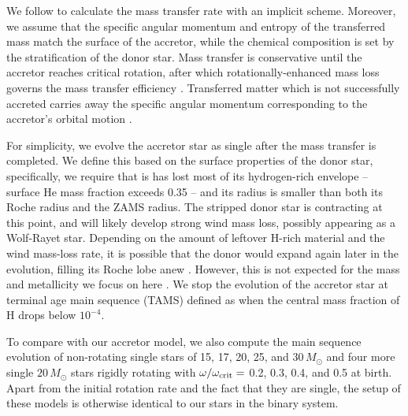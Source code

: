 \documentclass[twocolumn,twocolappendix,trackchanges]{aastex63}
\begin{document}
We follow \cite{kolb:90} to calculate the mass transfer rate with an
implicit scheme. Moreover, we assume that the specific angular
momentum and entropy of the transferred mass match the surface of the
accretor, while the chemical composition is set by the stratification
of the donor star. Mass transfer is conservative until the accretor
reaches critical rotation, after which rotationally-enhanced mass loss
governs the mass transfer efficiency \citep[e.g.,][]{petrovic:05}.
Transferred matter which is not successfully accreted carries away the
specific angular momentum corresponding to the accretor's orbital
motion \citep[e.g.,][]{soberman:97, vandenheuvel:17}.


For simplicity, we evolve the accretor star as single after the mass
transfer is completed. We define this based on the surface properties
of the donor star, specifically, we require that is has lost most of
its hydrogen-rich envelope -- surface He mass fraction exceeds 0.35 --
and its radius is smaller than both its Roche radius and the ZAMS
radius. The stripped donor star is contracting at this point, and
will likely develop strong wind mass loss, possibly appearing as a
Wolf-Rayet star. Depending on the amount of leftover H-rich material
and the wind mass-loss rate, it is possible that the donor would
expand again later in the evolution, filling its Roche lobe anew
\citep[cf.,][]{gilkis:19}. However, this is not expected for the mass
and metallicity we focus on here \citep[e.g.,][]{laplace:20}. We stop the evolution
of the accretor star at terminal age main sequence (TAMS) defined as
when the central mass fraction of H drops below $10^{-4}$.

To compare with our accretor model, we also compute the main sequence
evolution of non-rotating single stars of 15, 17, 20, 25, and
30$\,M_\odot$ and four more single $20\,M_\odot$ stars rigidly rotating with
$\omega/\omega _{\rm crit} = $ 0.2, 0.3, 0.4, and 0.5 at birth. Apart
from the initial rotation rate and the fact that they are single, the
setup of these models is otherwise identical to our stars in the binary system.
\end{document}
